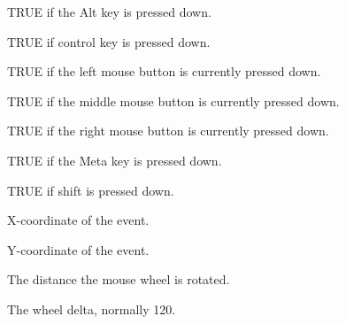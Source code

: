 


TRUE if the Alt key is pressed down.



TRUE if control key is pressed down.



TRUE if the left mouse button is currently pressed down.



TRUE if the middle mouse button is currently pressed down.



TRUE if the right mouse button is currently pressed down.



TRUE if the Meta key is pressed down.



TRUE if shift is pressed down.



X-coordinate of the event.



Y-coordinate of the event.



The distance the mouse wheel is rotated.



The wheel delta, normally 120.

